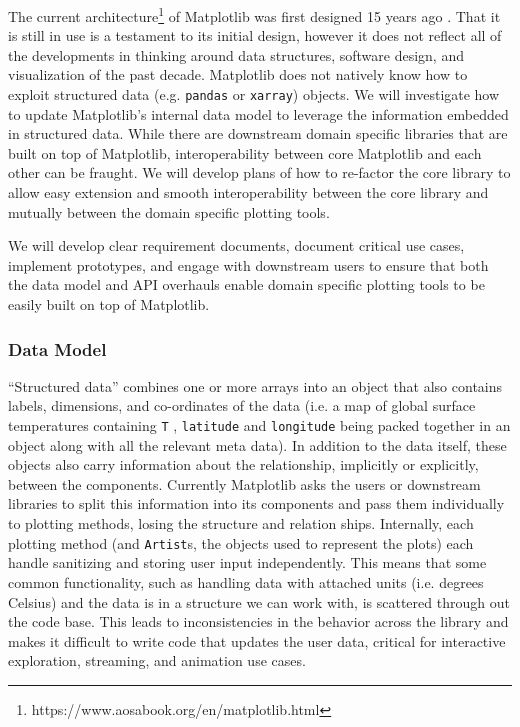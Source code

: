 \documentclass[11pt]{article}  %
\begin{document}
The current
architecture\footnote{https://www.aosabook.org/en/matplotlib.html} of
Matplotlib was first designed 15 years ago \cite{Hunter:2007}.  That
it is still in use is a testament to its initial design, however it
does not reflect all of the developments in thinking around data
structures, software design, and visualization of the past decade.
Matplotlib does not natively know how to exploit structured data
(e.g. \texttt{pandas} or \texttt{xarray}) objects.  We will investigate
how to update Matplotlib's internal data model to leverage the
information embedded in structured data.  While there are downstream
domain specific libraries that are built on top of Matplotlib,
interoperability between core Matplotlib and each other can be
fraught.  We will develop plans of how to re-factor the core library
to allow easy extension and smooth interoperability between the core
library and mutually between the domain specific plotting tools.

We will develop clear requirement documents, document critical use
cases, implement prototypes, and engage with downstream users to
ensure that both the data model and API overhauls enable domain
specific plotting tools to be easily built on top of Matplotlib.


\subsubsection{Data Model}

``Structured data'' combines one or more arrays into an object that
also contains labels, dimensions, and co-ordinates of the data (i.e. a
map of global surface temperatures containing \texttt{T} ,
\texttt{latitude} and \texttt{longitude} being packed together in an
object along with all the relevant meta data).  In addition to the
data itself, these objects also carry information about the
relationship, implicitly or explicitly, between the components.
Currently Matplotlib asks the users or downstream libraries to split
this information into its components and pass them individually to
plotting methods, losing the structure and relation ships.
Internally, each plotting method (and \texttt{Artist}s, the objects
used to represent the plots) each handle sanitizing and storing user
input independently.  This means that some common functionality, such
as handling data with attached units (i.e. degrees Celsius) and the
data is in a structure we can work with, is scattered through out the
code base.  This leads to inconsistencies in the behavior across the
library and makes it difficult to write code that updates the user
data, critical for interactive exploration, streaming, and animation
use cases.
\end{document}
